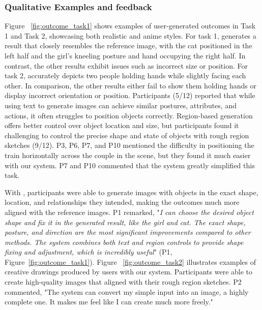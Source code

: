 \subsubsection{Qualitative Examples and feedback}
Figure ~\ref{fig:outcome_task1} shows examples of user-generated outcomes in Task 1 and Task 2, showcasing both realistic and anime styles.
For task 1, \tool generates a result that closely resembles the reference image, with the cat positioned in the left half and the girl's kneeling posture and hand occupying the right half. In contrast, the other results exhibit issues such as incorrect size or position.
For task 2, \tool accurately depicts two people holding hands while slightly facing each other. In comparison, the other results either fail to show them holding hands or display incorrect orientation or position.
Participants (5/12) reported that while using text to generate images can achieve similar postures, attributes, and actions, it often struggles to position objects correctly. 
Region-based generation offers better control over object location and size, but participants found it challenging to control the precise shape and state of objects with rough region sketches (9/12).
P3, P6, P7, and P10 mentioned the difficulty in positioning the train horizontally across the couple in the scene, but they found it much easier with our system.
P7 and P10 commented that the system greatly simplified this task.


With \tool, participants were able to generate images with objects in the exact shape, location, and relationships they intended, making the outcomes much more aligned with the reference images. 
P1 remarked, "\emph{I can choose the desired object shape and fix it in the generated result, like the girl and cat. The exact shape, posture, and direction are the most significant improvements compared to other methods. The system combines both text and region controls to provide shape fixing and adjustment, which is incredibly useful}" (P1, Figure~\ref{fig:outcome_task1}).
Figure ~\ref{fig:outcome_task2} illustrates examples of creative drawings produced by users with our system. Participants were able to create high-quality images that aligned with their rough region sketches. P2 commented, "The system can convert my simple input into an image, a highly complete one. It makes me feel like I can create much more freely."

